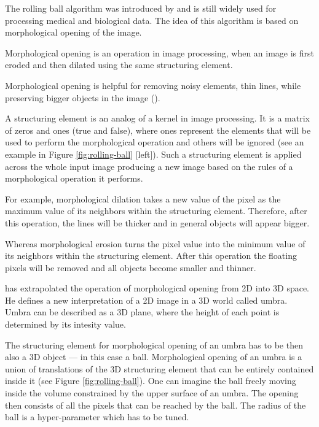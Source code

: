 The rolling ball algorithm was introduced by \cite{Sternberg_1983} and is still widely used for processing medical and biological data. The idea of this algorithm is based on morphological opening of the image. 

\begin{definition}
	\label{def:morphological-opening}
	Morphological opening is an operation in image processing, when an image is first eroded and then dilated using the same structuring element. 
\end{definition}

Morphological opening is helpful for removing noisy elements, thin lines, while preserving bigger objects in the image (\cite{morph_open}).

A structuring element is an analog of a kernel in image processing. It is a matrix of zeros and ones (true and false), where ones represent the elements that will be used to perform the morphological operation and others will be ignored (see an example in Figure \ref{fig:rolling-ball} [left]). Such a structuring element is applied across the whole input image producing a new image based on the rules of a morphological operation it performs.  

For example, morphological dilation takes a new value of the pixel as the maximum value of its neighbors within the structuring element. Therefore, after this operation, the lines will be thicker and in general objects will appear bigger.

Whereas morphological erosion turns the pixel value into the minimum value of its neighbors within the structuring element. After this operation the floating pixels will be removed and all objects become smaller and thinner.

\cite{Sternberg_1983} has extrapolated the operation of morphological opening from 2D into 3D space. He defines a new interpretation of a 2D image in a 3D world called umbra. Umbra can be described as a 3D plane, where the height of each point is determined by its intesity value.

The structuring element for morphological opening of an umbra has to be then also a 3D object --- in this case a ball. Morphological opening of an umbra is a union of translations of the 3D structuring element that can be entirely contained inside it (see Figure \ref{fig:rolling-ball}). One can imagine the ball freely moving inside the volume constrained by the upper surface of an umbra. The opening then consists of all the pixels that can be reached by the ball. The radius of the ball is a hyper-parameter which has to be tuned.

